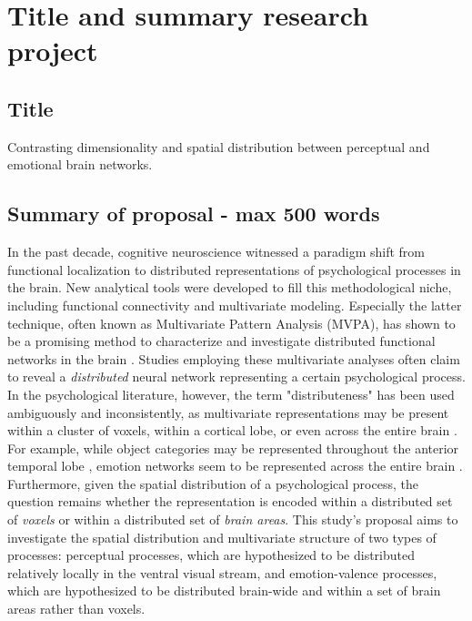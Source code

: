 \documentclass[12pt,a4paper]{article}\usepackage[]{graphicx}\usepackage[]{color}
\begin{document}
\section{Title and summary research project}

\subsection{Title}
Contrasting dimensionality and spatial distribution between perceptual and emotional brain networks.

\subsection{Summary of proposal \textmd{- max 500 words}}
In the past decade, cognitive neuroscience witnessed a paradigm shift from functional localization to distributed representations of psychological processes in the brain. New analytical tools were developed to fill this methodological niche, including functional connectivity and multivariate modeling. Especially the latter technique, often known as Multivariate Pattern Analysis (MVPA), has shown to be a promising method to characterize and investigate distributed functional networks in the brain . Studies employing these multivariate analyses often claim to reveal a \emph{distributed} neural network representing a certain psychological process. In the psychological literature, however, the term "distributeness" has been used ambiguously and inconsistently, as multivariate representations may be present within a cluster of voxels, within a cortical lobe, or even across the entire brain \citep{coutanche2013}. For example, while object categories may be represented throughout the anterior temporal lobe \citep{haxby2001}, emotion networks seem to be represented across the entire brain \citep{lindquist2012}. Furthermore, given the spatial distribution of a psychological process, the question remains whether the representation is encoded within a distributed set of \emph{voxels} or within a distributed set of \emph{brain areas}. This study's proposal aims to investigate the spatial distribution and multivariate structure of two types of processes: perceptual processes, which are hypothesized to be distributed relatively locally in the ventral visual stream, and emotion-valence processes, which are hypothesized to be distributed brain-wide and within a set of brain areas rather than voxels. 
\end{document}
